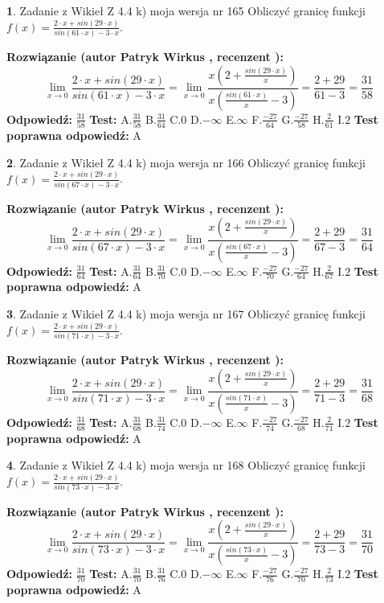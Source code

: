 \documentclass[12pt, a4paper]{article}
\theoremstyle{definition} %
\newtheorem{zad}{}
\newcommand{\zadStart}[1]{\begin{zad}#1\newline}
\newcommand{\zadStop}{\end{zad}}
\newcommand{\rozwStart}[2]{\noindent \textbf{Rozwiązanie (autor #1 , recenzent #2): }\newline}
\newcommand{\rozwStop}{\newline}
\newcommand{\odpStart}{\noindent \textbf{Odpowiedź:}\newline}
\newcommand{\odpStop}{\newline}
\newcommand{\testStart}{\noindent \textbf{Test:}\newline}
\newcommand{\testStop}{\newline}
\newcommand{\kluczStart}{\noindent \textbf{Test poprawna odpowiedź:}\newline}
\newcommand{\kluczStop}{\newline}
\begin{document}
\zadStart{Zadanie z Wikieł Z 4.4 k) moja wersja nr 165}
Obliczyć granicę funkcji $f(x)=\frac{2\cdot x +sin(29\cdot x)}{sin(61\cdot x) -3\cdot x}$.
\zadStop
\rozwStart{Patryk Wirkus}{}
$$\lim\limits_{x\to 0}\frac{2\cdot x +sin(29\cdot x)}{sin(61\cdot x) -3\cdot x}
=\lim\limits_{x\to 0}\frac{x(2+\frac{sin(29\cdot x)}{x})}{x(\frac{sin(61\cdot x)}{x}-3)}
=\frac{2+29}{61-3} = \frac{31}{58}$$
\rozwStop
\odpStart
$\frac{31}{58}$
\odpStop
\testStart
A.$\frac{31}{58}$
B.$\frac{31}{64}$
C.$0$
D.$-\infty$
E.$\infty$
F.$\frac{-27}{64}$
G.$\frac{-27}{58}$
H.$\frac{2}{61}$
I.$2$
\testStop
\kluczStart
A
\kluczStop



\zadStart{Zadanie z Wikieł Z 4.4 k) moja wersja nr 166}
Obliczyć granicę funkcji $f(x)=\frac{2\cdot x +sin(29\cdot x)}{sin(67\cdot x) -3\cdot x}$.
\zadStop
\rozwStart{Patryk Wirkus}{}
$$\lim\limits_{x\to 0}\frac{2\cdot x +sin(29\cdot x)}{sin(67\cdot x) -3\cdot x}
=\lim\limits_{x\to 0}\frac{x(2+\frac{sin(29\cdot x)}{x})}{x(\frac{sin(67\cdot x)}{x}-3)}
=\frac{2+29}{67-3} = \frac{31}{64}$$
\rozwStop
\odpStart
$\frac{31}{64}$
\odpStop
\testStart
A.$\frac{31}{64}$
B.$\frac{31}{70}$
C.$0$
D.$-\infty$
E.$\infty$
F.$\frac{-27}{70}$
G.$\frac{-27}{64}$
H.$\frac{2}{67}$
I.$2$
\testStop
\kluczStart
A
\kluczStop



\zadStart{Zadanie z Wikieł Z 4.4 k) moja wersja nr 167}
Obliczyć granicę funkcji $f(x)=\frac{2\cdot x +sin(29\cdot x)}{sin(71\cdot x) -3\cdot x}$.
\zadStop
\rozwStart{Patryk Wirkus}{}
$$\lim\limits_{x\to 0}\frac{2\cdot x +sin(29\cdot x)}{sin(71\cdot x) -3\cdot x}
=\lim\limits_{x\to 0}\frac{x(2+\frac{sin(29\cdot x)}{x})}{x(\frac{sin(71\cdot x)}{x}-3)}
=\frac{2+29}{71-3} = \frac{31}{68}$$
\rozwStop
\odpStart
$\frac{31}{68}$
\odpStop
\testStart
A.$\frac{31}{68}$
B.$\frac{31}{74}$
C.$0$
D.$-\infty$
E.$\infty$
F.$\frac{-27}{74}$
G.$\frac{-27}{68}$
H.$\frac{2}{71}$
I.$2$
\testStop
\kluczStart
A
\kluczStop



\zadStart{Zadanie z Wikieł Z 4.4 k) moja wersja nr 168}
Obliczyć granicę funkcji $f(x)=\frac{2\cdot x +sin(29\cdot x)}{sin(73\cdot x) -3\cdot x}$.
\zadStop
\rozwStart{Patryk Wirkus}{}
$$\lim\limits_{x\to 0}\frac{2\cdot x +sin(29\cdot x)}{sin(73\cdot x) -3\cdot x}
=\lim\limits_{x\to 0}\frac{x(2+\frac{sin(29\cdot x)}{x})}{x(\frac{sin(73\cdot x)}{x}-3)}
=\frac{2+29}{73-3} = \frac{31}{70}$$
\rozwStop
\odpStart
$\frac{31}{70}$
\odpStop
\testStart
A.$\frac{31}{70}$
B.$\frac{31}{76}$
C.$0$
D.$-\infty$
E.$\infty$
F.$\frac{-27}{76}$
G.$\frac{-27}{70}$
H.$\frac{2}{73}$
I.$2$
\testStop
\kluczStart
A
\kluczStop
\end{document}
